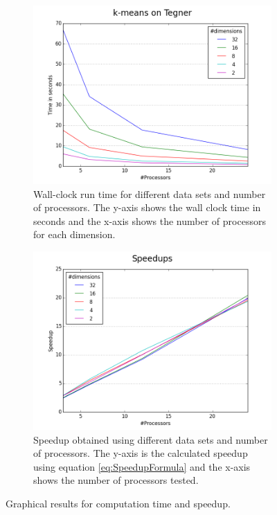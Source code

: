 \documentclass[parskip=true]{scrartcl}
\begin{document}
\begin{figure}[h]
\centering
    \begin{subfigure}{0.5\textwidth}
    \centering
        \captionsetup{width=0.9\linewidth}
        \includegraphics[width=1.1\linewidth]{img/Times}
        \caption{Wall-clock run time for different data sets and number of processors. The y-axis shows the wall clock time in seconds and the x-axis shows the number of processors for each dimension.}
        \label{fig:times}
    \end{subfigure}%
    \begin{subfigure}{0.5\textwidth}
    \centering
        \captionsetup{width=0.9\linewidth}
        \includegraphics[width=1.1\linewidth]{img/Speedups}
        \caption{Speedup obtained using different data sets and number of processors. The y-axis is the calculated speedup using equation \ref{eq:SpeedupFormula} and the x-axis shows the number of processors tested.}
        \label{fig:speedup}
    \end{subfigure}
\caption{Graphical results for computation time and speedup.}
\label{fig:Q112_pool}
\end{figure}
\end{document}
